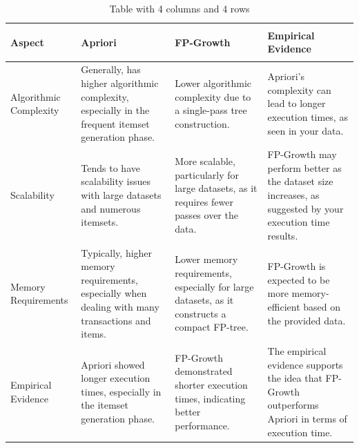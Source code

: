 \begin{table}[htbp]
    \centering
    \begin{tabular}{|>{\bfseries\raggedright\arraybackslash}p{3cm}|>{\raggedright\arraybackslash}p{3cm}|>{\raggedright\arraybackslash}p{3cm}|>{\raggedright\arraybackslash}p{3cm}|}
        \hline
        \rowcolor{pink!80}
        {\textbf{Aspect}} & {\textbf{Apriori}} & {\textbf{FP-Growth}} & {\textbf{Empirical Evidence}} \\
        \hline
        Algorithmic Complexity & Generally, has higher algorithmic complexity, especially in the frequent itemset generation phase. & Lower algorithmic complexity due to a single-pass tree construction.& Apriori's complexity can lead to longer execution times, as seen in your data. \\
        Scalability & Tends to have scalability issues with large datasets and numerous itemsets. & More scalable, particularly for large datasets, as it requires fewer passes over the data. & FP-Growth may perform better as the dataset size increases, as suggested by your execution time results. \\
        Memory Requirements & Typically, higher memory requirements, especially when dealing with many transactions and items. & Lower memory requirements, especially for large datasets, as it constructs a compact FP-tree. & FP-Growth is expected to be more memory-efficient based on the provided data. \\
        Empirical Evidence & Apriori showed longer execution times, especially in the itemset generation phase. & FP-Growth demonstrated shorter execution times, indicating better performance. & The empirical evidence supports the idea that FP-Growth outperforms Apriori in terms of execution time. \\
        \hline
    \end{tabular}
    \caption{Table with 4 columns and 4 rows}
    \label{tab:4x4_sentences}
\end{table}
% 


